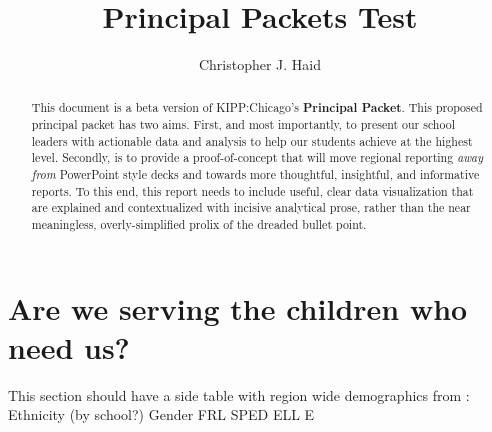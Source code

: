\documentclass[sfsidenotes, justified]{tufte-handout}\usepackage{graphicx, color}
\title{Principal Packets Test}
\author{Christopher J. Haid}
\begin{document}
\maketitle
\begin{abstract}
This document is a beta version of KIPP:Chicago's \textbf{Principal Packet}.  This proposed principal packet has two aims.  First, and most importantly, to present our school leaders with actionable data and analysis to help our students achieve at the highest level.  Secondly, is to provide a proof-of-concept that will move regional reporting \emph{away from} PowerPoint style decks and towards more thoughtful, insightful, and informative reports.  To this end, this report needs to include useful, clear data visualization that are explained and contextualized with incisive analytical prose, rather than the near meaningless, overly-simplified prolix of the dreaded bullet point.
\end{abstract}





















  











\section{Are we serving the children who need us?}
This section should have a side table with region wide demographics from :
  Ethnicity (by school?)
  Gender
  FRL
  SPED
  ELL
  E
\end{document}
